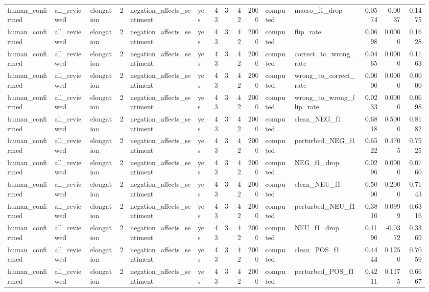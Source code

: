 \begin{tabular}{lllrllrrrrllrrr}
human_confirmed & all_reviewed & elongation & 2 & negation_affects_sentiment & yes & 43 & 3 & 42 & 2000 & computed & macro_f1_drop & 0.0574 & -0.0037 & 0.1475 \\
human_confirmed & all_reviewed & elongation & 2 & negation_affects_sentiment & yes & 43 & 3 & 42 & 2000 & computed & flip_rate & 0.0698 & 0.0000 & 0.1628 \\
human_confirmed & all_reviewed & elongation & 2 & negation_affects_sentiment & yes & 43 & 3 & 42 & 2000 & computed & correct_to_wrong_rate & 0.0465 & 0.0000 & 0.1163 \\
human_confirmed & all_reviewed & elongation & 2 & negation_affects_sentiment & yes & 43 & 3 & 42 & 2000 & computed & wrong_to_correct_rate & 0.0000 & 0.0000 & 0.0000 \\
human_confirmed & all_reviewed & elongation & 2 & negation_affects_sentiment & yes & 43 & 3 & 42 & 2000 & computed & wrong_to_wrong_flip_rate & 0.0233 & 0.0000 & 0.0698 \\
human_confirmed & all_reviewed & elongation & 2 & negation_affects_sentiment & yes & 43 & 3 & 42 & 2000 & computed & clean_NEG_f1 & 0.6818 & 0.5000 & 0.8182 \\
human_confirmed & all_reviewed & elongation & 2 & negation_affects_sentiment & yes & 43 & 3 & 42 & 2000 & computed & perturbed_NEG_f1 & 0.6522 & 0.4705 & 0.7925 \\
human_confirmed & all_reviewed & elongation & 2 & negation_affects_sentiment & yes & 43 & 3 & 42 & 2000 & computed & NEG_f1_drop & 0.0296 & 0.0000 & 0.0760 \\
human_confirmed & all_reviewed & elongation & 2 & negation_affects_sentiment & yes & 43 & 3 & 42 & 2000 & computed & clean_NEU_f1 & 0.5000 & 0.2000 & 0.7143 \\
human_confirmed & all_reviewed & elongation & 2 & negation_affects_sentiment & yes & 43 & 3 & 42 & 2000 & computed & perturbed_NEU_f1 & 0.3810 & 0.0999 & 0.6316 \\
human_confirmed & all_reviewed & elongation & 2 & negation_affects_sentiment & yes & 43 & 3 & 42 & 2000 & computed & NEU_f1_drop & 0.1190 & -0.0372 & 0.3369 \\
human_confirmed & all_reviewed & elongation & 2 & negation_affects_sentiment & yes & 43 & 3 & 42 & 2000 & computed & clean_POS_f1 & 0.4444 & 0.1250 & 0.7059 \\
human_confirmed & all_reviewed & elongation & 2 & negation_affects_sentiment & yes & 43 & 3 & 42 & 2000 & computed & perturbed_POS_f1 & 0.4211 & 0.1175 & 0.6667 \\

\end{tabular}
